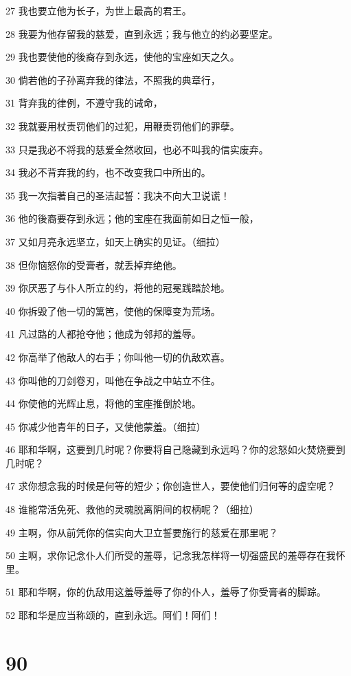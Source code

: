 \par 27 我也要立他为长子，为世上最高的君王。
\par 28 我要为他存留我的慈爱，直到永远；我与他立的约必要坚定。
\par 29 我也要使他的後裔存到永远，使他的宝座如天之久。
\par 30 倘若他的子孙离弃我的律法，不照我的典章行，
\par 31 背弃我的律例，不遵守我的诫命，
\par 32 我就要用杖责罚他们的过犯，用鞭责罚他们的罪孽。
\par 33 只是我必不将我的慈爱全然收回，也必不叫我的信实废弃。
\par 34 我必不背弃我的约，也不改变我口中所出的。
\par 35 我一次指著自己的圣洁起誓：我决不向大卫说谎！
\par 36 他的後裔要存到永远；他的宝座在我面前如日之恒一般，
\par 37 又如月亮永远坚立，如天上确实的见证。（细拉）
\par 38 但你恼怒你的受膏者，就丢掉弃绝他。
\par 39 你厌恶了与仆人所立的约，将他的冠冕践踏於地。
\par 40 你拆毁了他一切的篱笆，使他的保障变为荒场。
\par 41 凡过路的人都抢夺他；他成为邻邦的羞辱。
\par 42 你高举了他敌人的右手；你叫他一切的仇敌欢喜。
\par 43 你叫他的刀剑卷刃，叫他在争战之中站立不住。
\par 44 你使他的光辉止息，将他的宝座推倒於地。
\par 45 你减少他青年的日子，又使他蒙羞。（细拉）
\par 46 耶和华啊，这要到几时呢？你要将自己隐藏到永远吗？你的忿怒如火焚烧要到几时呢？
\par 47 求你想念我的时候是何等的短少；你创造世人，要使他们归何等的虚空呢？
\par 48 谁能常活免死、救他的灵魂脱离阴间的权柄呢？（细拉）
\par 49 主啊，你从前凭你的信实向大卫立誓要施行的慈爱在那里呢？
\par 50 主啊，求你记念仆人们所受的羞辱，记念我怎样将一切强盛民的羞辱存在我怀里。
\par 51 耶和华啊，你的仇敌用这羞辱羞辱了你的仆人，羞辱了你受膏者的脚踪。
\par 52 耶和华是应当称颂的，直到永远。阿们！阿们！

\chapter{90}

